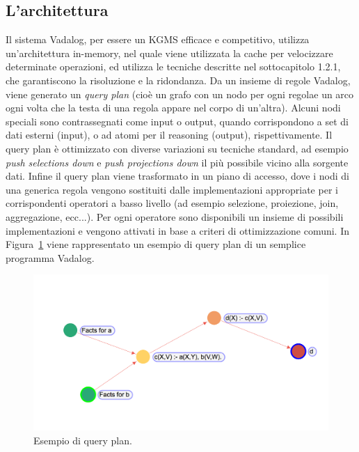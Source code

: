 \subsection{L'architettura}

Il sistema Vadalog, per essere un KGMS efficace e competitivo, utilizza un'architettura in-memory, nel quale viene utilizzata la cache per velocizzare determinate operazioni, ed utilizza le tecniche descritte nel sottocapitolo 1.2.1, che garantiscono la risoluzione e la ridondanza. \newline
Da un insieme di regole Vadalog, viene generato un \textit{query plan} (cioè un grafo con un nodo per ogni regolae un arco ogni volta che la testa di una regola appare nel corpo di un'altra). \newline
Alcuni nodi speciali sono contrassegnati come input o output, quando corrispondono a set di dati esterni (input), o ad atomi per il reasoning (output), rispettivamente.
Il query plan è ottimizzato con diverse variazioni su tecniche standard, ad esempio \textit{push selections down} e \textit{push projections down} il più possibile vicino alla sorgente dati. \newline
Infine il query plan viene trasformato in un piano di accesso, dove i nodi di una generica regola vengono sostituiti dalle implementazioni appropriate per i corrispondenti operatori a basso livello (ad esempio selezione, proiezione, join, aggregazione, ecc...). \newline
Per ogni operatore sono disponibili un insieme di possibili implementazioni e vengono attivati in base a criteri di ottimizzazione comuni. \newline
In Figura~\ref{fig:query_plan_1} viene rappresentato un esempio di query plan di un semplice programma Vadalog.
\begin{figure}[h!]
	\centering
	\includegraphics[width=0.8\linewidth]{figure/query-plan-ex1}
	\caption{Esempio di query plan.}
	\label{fig:query_plan_1}
\end{figure}

